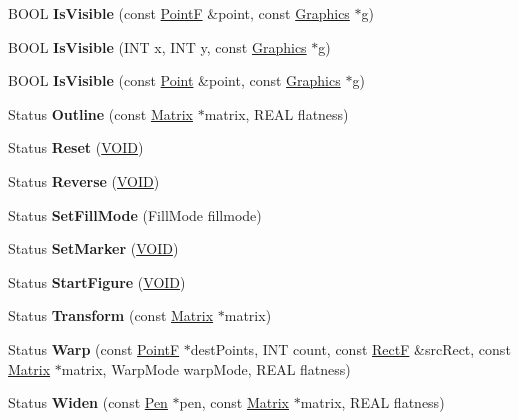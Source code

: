 \begin{DoxyCompactItemize}
B\+O\+OL {\bfseries Is\+Visible} (const \hyperlink{struct_point_f}{PointF} \&point, const \hyperlink{class_graphics}{Graphics} $\ast$g)
\item 
\mbox{\label{class_graphics_path_acc42108f259f5067358308406b03282b}} 
B\+O\+OL {\bfseries Is\+Visible} (I\+NT x, I\+NT y, const \hyperlink{class_graphics}{Graphics} $\ast$g)
\item 
\mbox{\label{class_graphics_path_a56baace8994fe5a7dfc3cee1f7cc5d24}} 
B\+O\+OL {\bfseries Is\+Visible} (const \hyperlink{struct_point}{Point} \&point, const \hyperlink{class_graphics}{Graphics} $\ast$g)
\item 
\mbox{\label{class_graphics_path_ab393c3173e8837a3a8468a98dd4181f1}} 
Status {\bfseries Outline} (const \hyperlink{class_matrix}{Matrix} $\ast$matrix, R\+E\+AL flatness)
\item 
\mbox{\label{class_graphics_path_a35435587a06f308aec98c87304708c49}} 
Status {\bfseries Reset} (\hyperlink{interfacevoid}{V\+O\+ID})
\item 
\mbox{\label{class_graphics_path_a2af0a022c18b0544a29005420d728f29}} 
Status {\bfseries Reverse} (\hyperlink{interfacevoid}{V\+O\+ID})
\item 
\mbox{\label{class_graphics_path_aad959a9b26f03a1b69867b29565a2c0d}} 
Status {\bfseries Set\+Fill\+Mode} (Fill\+Mode fillmode)
\item 
\mbox{\label{class_graphics_path_a650ea4efe1a3a9bc217318104c55e9f3}} 
Status {\bfseries Set\+Marker} (\hyperlink{interfacevoid}{V\+O\+ID})
\item 
\mbox{\label{class_graphics_path_abde5285dc3c875b1a6ed834e5cf7c433}} 
Status {\bfseries Start\+Figure} (\hyperlink{interfacevoid}{V\+O\+ID})
\item 
\mbox{\label{class_graphics_path_a51becbb7d545572ea18267740f2b97a6}} 
Status {\bfseries Transform} (const \hyperlink{class_matrix}{Matrix} $\ast$matrix)
\item 
\mbox{\label{class_graphics_path_aabf024eb55342e2c79b49e783f73b4a9}} 
Status {\bfseries Warp} (const \hyperlink{struct_point_f}{PointF} $\ast$dest\+Points, I\+NT count, const \hyperlink{struct_rect_f}{RectF} \&src\+Rect, const \hyperlink{class_matrix}{Matrix} $\ast$matrix, Warp\+Mode warp\+Mode, R\+E\+AL flatness)
\item 
\mbox{\label{class_graphics_path_a34e85a91d6772064f7740d8f048f34b2}} 
Status {\bfseries Widen} (const \hyperlink{class_pen}{Pen} $\ast$pen, const \hyperlink{class_matrix}{Matrix} $\ast$matrix, R\+E\+AL flatness)
\end{DoxyCompactItemize}

